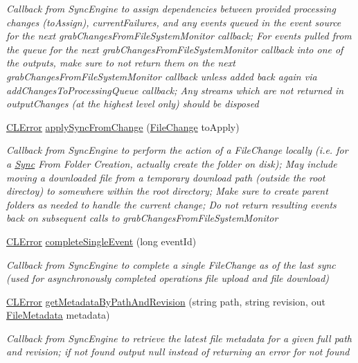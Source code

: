 \begin{DoxyCompactItemize}
$$\begin{DoxyCompactList}\small\item\em Callback from Sync\-Engine to assign dependencies between provided processing changes (to\-Assign), current\-Failures, and any events queued in the event source for the next grab\-Changes\-From\-File\-System\-Monitor callback; For events pulled from the queue for the next grab\-Changes\-From\-File\-System\-Monitor callback into one of the outputs, make sure to not return them on the next grab\-Changes\-From\-File\-System\-Monitor callback unless added back again via add\-Changes\-To\-Processing\-Queue callback; Any streams which are not returned in output\-Changes (at the highest level only) should be disposed \end{DoxyCompactList}\item 
\hyperlink{class_cloud_api_public_1_1_model_1_1_c_l_error}{C\-L\-Error} \hyperlink{interface_cloud_api_public_1_1_interfaces_1_1_i_sync_data_object_a2508ef227c6b6a7e0222a575df30f53c}{apply\-Sync\-From\-Change} (\hyperlink{class_cloud_api_public_1_1_model_1_1_file_change}{File\-Change} to\-Apply)
\begin{DoxyCompactList}\small\item\em Callback from Sync\-Engine to perform the action of a File\-Change locally (i.\-e. for a \hyperlink{namespace_cloud_api_public_1_1_sync}{Sync} From Folder Creation, actually create the folder on disk); May include moving a downloaded file from a temporary download path (outside the root directoy) to somewhere within the root directory; Make sure to create parent folders as needed to handle the current change; Do not return resulting events back on subsequent calls to grab\-Changes\-From\-File\-System\-Monitor \end{DoxyCompactList}\item 
\hyperlink{class_cloud_api_public_1_1_model_1_1_c_l_error}{C\-L\-Error} \hyperlink{interface_cloud_api_public_1_1_interfaces_1_1_i_sync_data_object_aeda55123f350e80434eb202601316828}{complete\-Single\-Event} (long event\-Id)
\begin{DoxyCompactList}\small\item\em Callback from Sync\-Engine to complete a single File\-Change as of the last sync (used for asynchronously completed operations file upload and file download) \end{DoxyCompactList}\item 
\hyperlink{class_cloud_api_public_1_1_model_1_1_c_l_error}{C\-L\-Error} \hyperlink{interface_cloud_api_public_1_1_interfaces_1_1_i_sync_data_object_ac9ff5ecaa81c07f9e19785db2c4d2368}{get\-Metadata\-By\-Path\-And\-Revision} (string path, string revision, out \hyperlink{class_cloud_api_public_1_1_model_1_1_file_metadata}{File\-Metadata} metadata)
\begin{DoxyCompactList}\small\item\em Callback from Sync\-Engine to retrieve the latest file metadata for a given full path and revision; if not found output null instead of returning an error for not found \end{DoxyCompactList}\end{DoxyCompactItemize}
